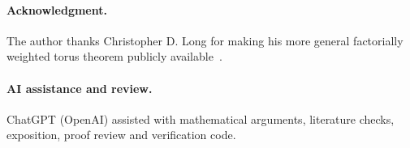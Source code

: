 \documentclass[11pt]{article}
\begin{document}
\paragraph{Acknowledgment.}
The author thanks Christopher D. Long for making his more general
factorially weighted torus theorem publicly available~\cite{LongTorus}.

\paragraph{AI assistance and review.}
ChatGPT (OpenAI) assisted with mathematical arguments, literature checks,
exposition, proof review and verification code.

\begingroup
\small


\endgroup
\end{document}
